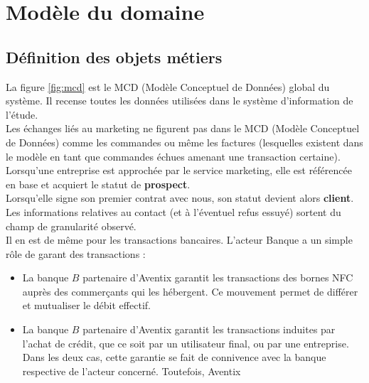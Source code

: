 




\section{Modèle du domaine}

\subsection{Définition des objets métiers}
La figure \ref{fig:mcd} est le MCD (Modèle Conceptuel de Données) global du
système. Il recense toutes les données utilisées dans le système d'information
de l'étude. \\

Les échanges liés au marketing ne figurent pas dans le MCD (Modèle Conceptuel
de Données) comme les commandes ou même les factures (lesquelles existent dans
le modèle en tant que commandes échues amenant une transaction certaine). \\

Lorsqu'une entreprise est approchée par le service marketing, elle est
référencée en base et  acquiert le statut de \textbf{prospect}. \\

Lorsqu'elle signe son premier contrat avec nous, son statut devient alors
\textbf{client}. \\

Les informations relatives au contact (et à l'éventuel refus essuyé) sortent du
champ de granularité observé. \\

Il en est de même pour les transactions bancaires. L'acteur Banque a un simple
rôle de garant des transactions : \\
\begin{itemize}
  \item La banque $B$ partenaire d'Aventix garantit les transactions des bornes
    NFC auprès des commerçants qui les hébergent. Ce mouvement permet de
    différer et mutualiser le débit effectif.
  \item La banque $B$ partenaire d'Aventix garantit les transactions induites
    par l'achat de crédit, que ce soit par un utilisateur final, ou par une
    entreprise. Dans les deux cas, cette garantie se fait de connivence avec la
    banque respective de l'acteur concerné. Toutefois, Aventix %
\end{itemize}
~\\

